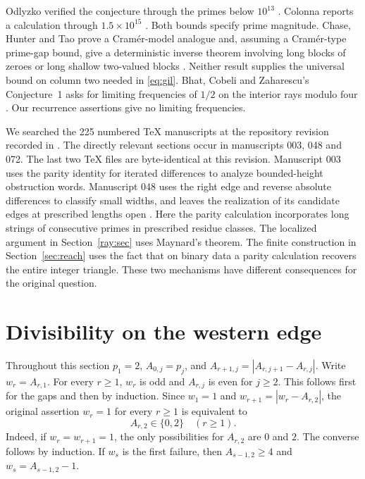 \documentclass[11pt,a4paper]{article}
\begin{document}
Odlyzko verified the conjecture through the primes below $10^{13}$ \cite{odlyzko}. Colonna reports a calculation through $1.5\times10^{15}$ \cite{colonna}. Both bounds specify prime magnitude. Chase, Hunter and Tao prove a Cram\'er-model analogue and, assuming a Cram\'er-type prime-gap bound, give a deterministic inverse theorem involving long blocks of zeroes or long shallow two-valued blocks \cite{cht}. Neither result supplies the universal bound on column two needed in \eqref{eq:gil}. Bhat, Cobeli and Zaharescu's Conjecture~1 asks for limiting frequencies of $1/2$ on the interior rays modulo four \cite{bcz}. Our recurrence assertions give no limiting frequencies.

We searched the 225 numbered TeX manuscripts at the repository revision recorded in \cite{vmthree}. The directly relevant sections occur in manuscripts 003, 048 and 072. The last two TeX files are byte-identical at this revision. Manuscript 003 uses the parity identity for iterated differences to analyze bounded-height obstruction words. Manuscript 048 uses the right edge and reverse absolute differences to classify small widths, and leaves the realization of its candidate edges at prescribed lengths open \cite{vmwidth}. Here the parity calculation incorporates long strings of consecutive primes in prescribed residue classes. The localized argument in Section~\ref{ray:sec} uses Maynard's theorem. The finite construction in Section~\ref{sec:reach} uses the fact that on binary data a parity calculation recovers the entire integer triangle. These two mechanisms have different consequences for the original question.

\section{Divisibility on the western edge}\label{sec:west}
Throughout this section $p_1=2$, $A_{0,j}=p_j$, and
$A_{r+1,j}=|A_{r,j+1}-A_{r,j}|$. Write $w_r=A_{r,1}$.
For every $r\ge1$, $w_r$ is odd and $A_{r,j}$ is even for $j\ge2$.
This follows first for the gaps and then by induction.
Since $w_1=1$ and $w_{r+1}=|w_r-A_{r,2}|$, the original assertion
$w_r=1$ for every $r\ge1$ is equivalent to
\[
                         A_{r,2}\in\{0,2\}\quad(r\ge1).
\]
Indeed, if $w_r=w_{r+1}=1$, the only possibilities for $A_{r,2}$ are
$0$ and $2$. The converse follows by induction. If $w_s$ is the first
failure, then $A_{s-1,2}\ge4$ and $w_s=A_{s-1,2}-1$.
\end{document}
